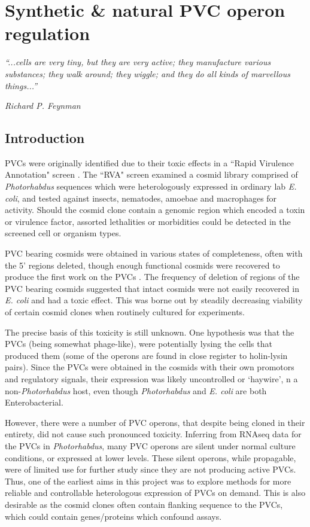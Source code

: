 \pagestyle{IHA-fancy-style}


\chapter{Synthetic \& natural PVC operon regulation}\label{regulation}

\epigraph{\emph{``...cells are very tiny, but they are very active; they manufacture various substances; they walk around; they wiggle; and they do all kinds of marvellous things...''}}{\textit{Richard P. Feynman}}

\section{Introduction}
PVCs were originally identified due to their toxic effects in a ``Rapid Virulence Annotation" screen \citep{Waterfield2008, Yang2006}. The ``RVA" screen examined a cosmid library comprised of \emph{Photorhabdus} sequences which were heterologously expressed in ordinary lab \emph{E. coli},  and tested against insects, nematodes, amoebae and macrophages for activity. Should the cosmid clone contain a genomic region which encoded a toxin or virulence factor, assorted lethalities or morbidities could be detected in the screened cell or organism types.

PVC bearing cosmids were obtained in various states of completeness, often with the 5' regions deleted, though enough functional cosmids were recovered to produce the first work on the PVCs \citep{Yang2006}. The frequency of deletion of regions of the PVC bearing cosmids suggested that intact cosmids were not easily recovered in \emph{E. coli} and had a toxic effect. This was borne out by steadily decreasing viability of certain cosmid clones when routinely cultured for experiments.

The precise basis of this toxicity is still unknown. One hypothesis was that the PVCs (being somewhat phage-like), were potentially lysing the cells that produced them (some of the operons are found in close register to holin-lysin pairs). Since the PVCs were obtained in the cosmids with their own promotors and regulatory signals, their expression was likely uncontrolled or `haywire', n a non-\emph{Photorhabdus} host, even though \emph{Photorhabdus} and \emph{E. coli} are both Enterobacterial.

However, there were a number of PVC operons, that despite being cloned in their entirety, did not cause such pronounced toxicity. Inferring from RNAseq data for the PVCs in \emph{Photorhabdus}, many PVC operons are silent under normal culture conditions, or expressed at lower levels. These silent operons, while propagable, were of limited use for further study since they are not producing active PVCs. Thus, one of the earliest aims in this project was to explore methods for more reliable and controllable heterologous expression of PVCs on demand. This is also desirable as the cosmid clones often contain flanking sequence to the PVCs, which could contain genes/proteins which confound assays.

